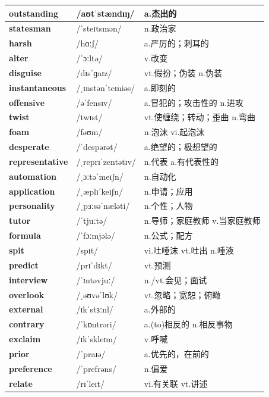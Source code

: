 \documentclass[14pt,a4paper]{extarticle}
\begin{document}
\begin{longtable}{ p{} p{} p{} }
\textbf{outstanding} & /aʊtˈstændɪŋ/ & a.杰出的 \\ \hline
\textbf{statesman} & /ˈsteɪtsmən/ & n.政治家 \\ \hline
\textbf{harsh} & /hɑːʃ/ & a.严厉的；刺耳的 \\ \hline
\textbf{alter} & /ˈɔːltə/ & v.改变 \\ \hline
\textbf{disguise} & /dɪsˈɡaɪz/ & vt.假扮；伪装 \quad n.伪装 \\ \hline
\textbf{instantaneous} & /ˌɪnstənˈteɪniəs/ & a.即刻的 \\ \hline
\textbf{offensive} & /əˈfensɪv/ & a.冒犯的；攻击性的 \quad n.进攻 \\ \hline
\textbf{twist} & /twɪst/ & vt.使缠绕；转动；歪曲 \quad n.弯曲 \\ \hline
\textbf{foam} & /fəʊm/ & n.泡沫 \quad vi.起泡沫 \\ \hline
\textbf{desperate} & /ˈdespərət/ & a.绝望的；极想望的 \\ \hline
\textbf{representative} & /ˌreprɪˈzentətɪv/ & n.代表 \quad a.有代表性的 \\ \hline
\textbf{automation} & /ˌɔːtəˈmeɪʃn/ & n.自动化 \\ \hline
\textbf{application} & /ˌæplɪˈkeɪʃn/ & n.申请；应用 \\ \hline
\textbf{personality} & /ˌpɜːsəˈnæləti/ & n.个性；人物 \\ \hline
\textbf{tutor} & /ˈtjuːtə/ & n.导师；家庭教师 \quad v.当家庭教师 \\ \hline
\textbf{formula} & /ˈfɔːmjələ/ & n.公式；配方 \\ \hline
\textbf{spit} & /spɪt/ & vi.吐唾沫 \quad vt.吐出 \quad n.唾液 \\ \hline
\textbf{predict} & /prɪˈdɪkt/ & vt.预测 \\ \hline
\textbf{interview} & /ˈɪntəvjuː/ & n./vt.会见；面试 \\ \hline
\textbf{overlook} & /ˌəʊvəˈlʊk/ & vt.忽略；宽恕；俯瞰 \\ \hline
\textbf{external} & /ɪkˈstɜːnl/ & a.外部的 \\ \hline
\textbf{contrary} & /ˈkɒntrəri/ & a.(to)相反的 \quad n.相反事物 \\ \hline
\textbf{exclaim} & /ɪkˈskleɪm/ & v.呼喊 \\ \hline
\textbf{prior} & /ˈpraɪə/ & a.优先的，在前的 \\ \hline
\textbf{preference} & /ˈprefrəns/ & n.偏爱 \\ \hline
\textbf{relate} & /rɪˈleɪt/ & vi.有关联 \quad vt.讲述 \\ \hline

\end{longtable}
\end{document}
